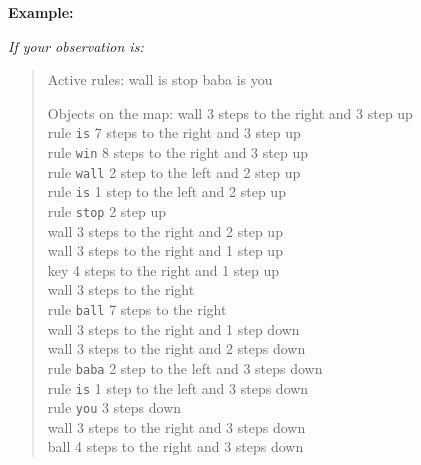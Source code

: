 \begin{GreenBox}[frametitle={\textbf{Iteration 2 Baba-is-ai Prompt}}]
\textbf{Example:}

\textit{If your observation is:}
\begin{quote}
Active rules:  
wall is stop  
baba is you  

Objects on the map:  
wall 3 steps to the right and 3 step up  \\
rule \texttt{is} 7 steps to the right and 3 step up  \\
rule \texttt{win} 8 steps to the right and 3 step up  \\
rule \texttt{wall} 2 step to the left and 2 step up  \\
rule \texttt{is} 1 step to the left and 2 step up  \\
rule \texttt{stop} 2 step up  \\
wall 3 steps to the right and 2 step up  \\
wall 3 steps to the right and 1 step up  \\
key 4 steps to the right and 1 step up  \\
wall 3 steps to the right  \\
rule \texttt{ball} 7 steps to the right  \\
wall 3 steps to the right and 1 step down  \\
wall 3 steps to the right and 2 steps down  \\
rule \texttt{baba} 2 step to the left and 3 steps down  \\
rule \texttt{is} 1 step to the left and 3 steps down  \\
rule \texttt{you} 3 steps down  \\
wall 3 steps to the right and 3 steps down  \\
ball 4 steps to the right and 3 steps down\\
\end{quote}


\end{GreenBox}
